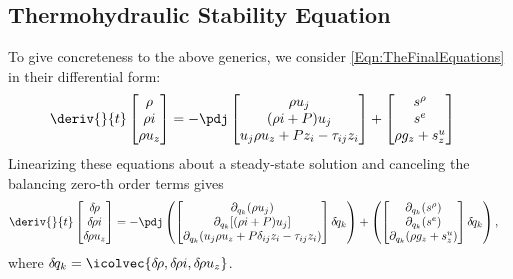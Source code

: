 \subsection{Thermohydraulic Stability Equation}

To give concreteness to the above generics, we consider \cref{Eqn:TheFinalEquations} in their differential form:
    \begin{align}
        \deriv{}{t}
        \begin{bmatrix}
            \rho \\ \rho i \\ \rho u_z 
        \end{bmatrix}
         &= 
        -\pdj
        \begin{bmatrix}
            \rho u_j     \\ 
            (\rho{i} + P) u_j\\
            u_j \rho u_z + P z_i - \tau_{ij} z_i
        \end{bmatrix}
        + 
        \begin{bmatrix}
            s^\rho \\
            s^e \\
            \rho g_z + s^u_z
        \end{bmatrix}
    \end{align}
Linearizing these equations about a steady-state solution and canceling the balancing zero-th order terms gives
    \begin{align}
        \deriv{}{t}
        \begin{bmatrix}
            \delta\mkern-2mu\rho \\ \delta\mkern-2mu\rho i \\ \delta\mkern-2mu\rho u_z 
        \end{bmatrix}
         &= 
        -\pdj
        \left(
            \begin{bmatrix}
                \partial_{q_k}(\rho u_j)\\
                \partial_{q_k}[(\rho{i} + P) u_j]\\
                \partial_{q_k}(u_j \rho u_z + P \delta_{ij}z_i - \tau_{ij}z_i) 
            \end{bmatrix}
            \delta\mkern-2mu q_k
        \right)
        + 
        \left(
        \begin{bmatrix}
            \partial_{q_k} ( s^\rho )\\
            \partial_{q_k}(s^e )\\
            \partial_{q_k}(\rho g_z + s^u_z ) 
        \end{bmatrix}
            \delta\mkern-2mu q_k
        \right),
    \end{align}
where $\delta\mkern-2mu q_k = \icolvec{\delta\mkern-2mu\rho,\delta\mkern-2mu\rho i,\delta\mkern-2mu\rho u_z}$.

